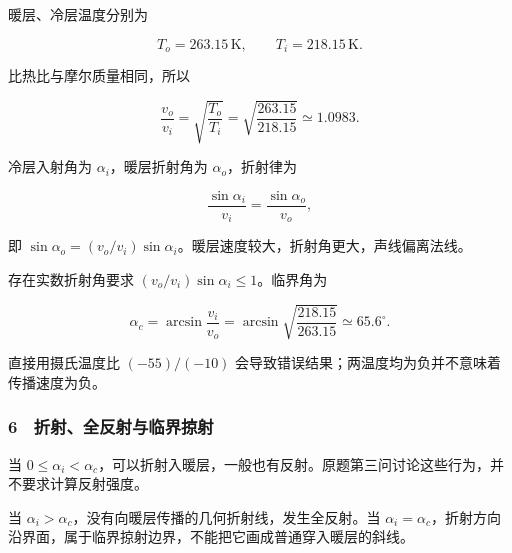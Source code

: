 \documentclass[12pt,a4paper,fontset=fandol]{ctexart}
\begin{document}
暖层、冷层温度分别为

\[T_o=263.15\,\mathrm K,\qquad T_i=218.15\,\mathrm K.\]

比热比与摩尔质量相同，所以

\[\frac{v_o}{v_i}=\sqrt{\frac{T_o}{T_i}}
=\sqrt{\frac{263.15}{218.15}}\simeq1.0983.\]

冷层入射角为 \(\alpha_i\)，暖层折射角为 \(\alpha_o\)，折射律为

\[\frac{\sin\alpha_i}{v_i}=\frac{\sin\alpha_o}{v_o},\]

即
\(\sin\alpha_o=(v_o/v_i)\sin\alpha_i\)。暖层速度较大，折射角更大，声线偏离法线。

存在实数折射角要求 \((v_o/v_i)\sin\alpha_i\le1\)。临界角为

\[\boxed{\alpha_c=\arcsin\frac{v_i}{v_o}
=\arcsin\sqrt{\frac{218.15}{263.15}}
\simeq65.6^\circ.}\]

直接用摄氏温度比 \((-55)/(-10)\)
会导致错误结果；两温度均为负并不意味着传播速度为负。

\subsubsection{6　折射、全反射与临界掠射}\label{ux6298ux5c04ux5168ux53cdux5c04ux4e0eux4e34ux754cux63a0ux5c04}

当
\(0\le\alpha_i<\alpha_c\)，可以折射入暖层，一般也有反射。原题第三问讨论这些行为，并不要求计算反射强度。

当 \(\alpha_i>\alpha_c\)，没有向暖层传播的几何折射线，发生全反射。当
\(\alpha_i=\alpha_c\)，折射方向沿界面，属于临界掠射边界，不能把它画成普通穿入暖层的斜线。

\begin{center}
\begin{minipage}{\linewidth}
\centering\begingroup{}
\ifdim\wd\diagrambox>.88\linewidth
\sbox{\diagrambox}{\resizebox{.88\linewidth}{!}{\usebox{\diagrambox}}}\fi
\ifdim\ht\diagrambox>.38\textheight
\resizebox{!}{.38\textheight}{\usebox{\diagrambox}}
\else\usebox{\diagrambox}\fi
\par{}\endgroup\end{minipage}\end{center}
\end{document}
